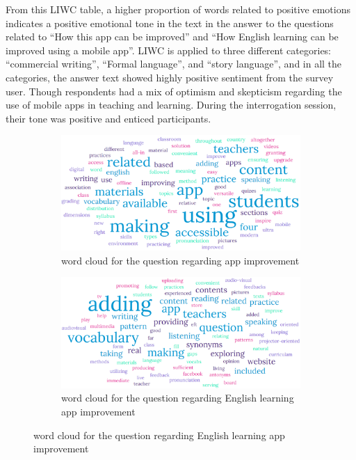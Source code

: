 \documentclass[sn-mathphys,Numbered]{sn-jnl}%
\theoremstyle{thmstyleone}%
\theoremstyle{thmstyletwo}%
\theoremstyle{thmstylethree}%
\begin{document}
From this LIWC table, a higher proportion of words related to positive emotions indicates a positive emotional tone in the text in the answer to the questions related to ``How this app can be improved'' and ``How English learning can be improved using a mobile app''. LIWC is applied to three different categories: ``commercial writing'', ``Formal language'', and ``story language'', and in all the categories, the answer text showed highly positive sentiment from the survey user. Though respondents had a mix of optimism and skepticism regarding the use of mobile apps in teaching and learning. During the interrogation session, their tone was positive and enticed participants.\\


\begin{figure}[h!]
\centering
\begin{subfigure}{0.48\textwidth}
    \includegraphics[width=\textwidth]{app_impv.png}
    \caption{word cloud for the question regarding app improvement}
    \label{word_cloud_1}
\end{subfigure}
\hfill
\begin{subfigure}{0.48\textwidth}
    \includegraphics[width=\textwidth]{eng_app_impv.png}
    \caption{word cloud for the question regarding English learning app improvement}
    \label{word_cloud_2}
\end{subfigure}       
\end{figure}
\end{document}
